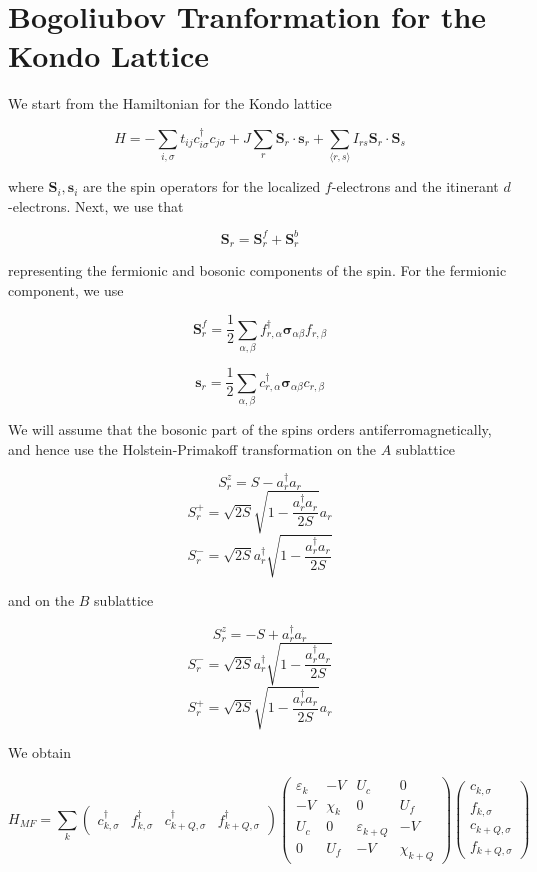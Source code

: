\documentclass[11pt, oneside]{article}
\begin{document}
\section{Bogoliubov Tranformation for the Kondo Lattice}

We start from the Hamiltonian for the Kondo lattice

$$ H = - \sum_{i,\sigma} t_{ij}c_{i\sigma}^\dagger c_{j\sigma} + 
J \sum_r \mathbf{S}_r\cdot \mathbf{s}_r +
\sum_{\langle r, s \rangle} I_{rs} \mathbf{S}_r \cdot \mathbf{S}_s $$

where $\mathbf{S}_{i},\mathbf{s}_{i}$ are the spin operators for the
localized $f$-electrons and the itinerant $d$-electrons.
Next, we use that

$$ \mathbf{S}_{r}=\mathbf{S}_{r}^{f}+\mathbf{S}_{r}^{b} $$

representing the fermionic and bosonic components of the spin. For the
fermionic component, we use

$$ \mathbf{S}_{r}^{f} =\frac{1}{2}\sum_{\alpha ,\beta }f_{r,\alpha }^{\dagger
}\mathbf{\sigma }_{\alpha \beta }f_{r,\beta } $$

$$ \mathbf{s}_{r} =\frac{1}{2}\sum_{\alpha ,\beta }c_{r,\alpha }^{\dagger }
\mathbf{\sigma }_{\alpha \beta }c_{r,\beta } $$

We will assume that the bosonic part of the spins orders
antiferromagnetically, and hence use the Holstein-Primakoff transformation
on the $A$ sublattice

$$ S_{r}^{z} = S-a_{r}^{\dagger }a_{r} $$
$$ S_{r}^{+} = \sqrt{2S}\sqrt{1-\frac{a_{r}^{\dagger }a_{r}}{2S}}a_{r} $$
$$ S_{r}^{-} = \sqrt{2S}a_{r}^{\dagger }\sqrt{1-\frac{a_{r}^{\dagger }a_{r}}{2S}} $$

and on the $B$ sublattice

$$ S_{r}^{z} = -S+a_{r}^{\dagger }a_{r} $$
$$ S_{r}^{-} = \sqrt{2S}a_{r}^{\dagger }\sqrt{1-\frac{a_{r}^{\dagger }a_{r}}{2S}} $$
$$ S_{r}^{+} = \sqrt{2S}\sqrt{1-\frac{a_{r}^{\dagger }a_{r}}{2S}}a_{r} $$



We obtain

$$ H_{MF}=\sum_{k}
\left(\begin{array}{cccc}
c_{k,\sigma }^{\dagger } & f_{k,\sigma }^{\dagger } & c_{k+Q,\sigma
}^{\dagger } & f_{k+Q,\sigma }^{\dagger }
\end{array} \right) 
\left( \begin{array}{cccc}
\varepsilon _{k} & -V & U_{c} & 0 \\
-V & \chi _{k} & 0 & U_{f} \\
U_{c} & 0 & \varepsilon _{k+Q} & -V \\
0 & U_{f} & -V & \chi _{k+Q}
\end{array}\right)
\left(\begin{array}{c}
c_{k,\sigma } \\
f_{k,\sigma } \\
c_{k+Q,\sigma } \\
f_{k+Q,\sigma }
\end{array}\right) $$
\end{document}
